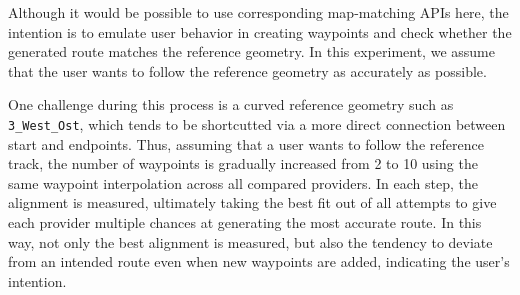 Although it would be possible to use corresponding map-matching APIs here, the intention is to emulate user behavior in creating waypoints and check whether the generated route matches the reference geometry. In this experiment, we assume that the user wants to follow the reference geometry as accurately as possible.

One challenge during this process is a curved reference geometry such as \texttt{3\_West\_Ost}, which tends to be shortcutted via a more direct connection between start and endpoints. Thus, assuming that a user wants to follow the reference track, the number of waypoints is gradually increased from 2 to 10 using the same waypoint interpolation across all compared providers. In each step, the alignment is measured, ultimately taking the best fit out of all attempts to give each provider multiple chances at generating the most accurate route. In this way, not only the best alignment is measured, but also the tendency to deviate from an intended route even when new waypoints are added, indicating the user's intention.

